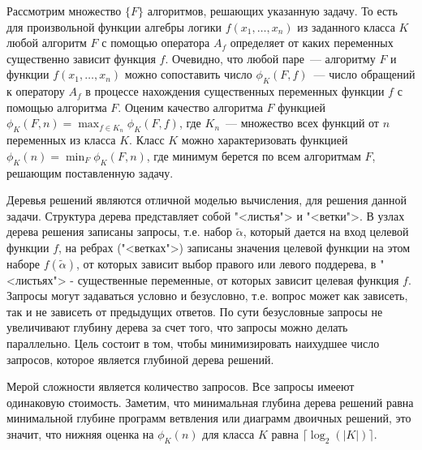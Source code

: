 \documentclass[oneside, final, 14pt]{extreport}
\begin{document}
	 Рассмотрим множество $\{F\}$ алгоритмов, решающих указанную задачу. То есть для произвольной функции алгебры логики $f(x_1, \ldots, x_n)$
	 из заданного класса $K$  любой алгоритм $F$ с помощью оператора $A_f$ определяет от каких переменных существенно зависит функция $f$.
	 Очевидно, что любой паре~--- алгоритму $F$ и функции $f(x_1, \ldots, x_n)$ можно сопоставить число $\phi_K(F,f)$~--- число обращений 
	 к оператору $A_f$ в процессе нахождения существенных переменных функции $f$ с помощью алгоритма $F$.  
	 Оценим качество алгоритма $F$ функцией $\phi_K(F,n) = \max_{f \in K_n}\phi_K(F, f)$, где $K_n$~--- множество всех функций от $n$ переменных из класса $K$.
	 Класс $K$ можно характеризовать функцией $\phi_K(n) = \min_F\phi_K(F, n)$, где минимум берется по всем алгоритмам $F$, решающим поставленную задачу.
	
	Деревья решений являются отличной  моделью вычисления, для решения данной задачи. Структура дерева представляет собой "<листья">
	и "<ветки">. В узлах дерева решения записаны запросы, т.е. набор $\tilde{\alpha}$, который дается на вход целевой функции $f$,
	на ребрах ("<ветках">) записаны значения целевой функции на этом наборе $f(\tilde{\alpha})$, от которых зависит выбор правого или левого
	поддерева, в "<листьях"> - существенные переменные, от которых зависит целевая функция $f$. Запросы могут задаваться условно и безусловно,
	т.е. вопрос может как зависеть, так и не зависеть  от предыдущих ответов. По сути безусловные запросы не увеличивают глубину дерева 
	за счет того, что запросы можно делать параллельно. Цель состоит в том, чтобы минимизировать наихудшее число запросов, которое
	является глубиной дерева решений.
	
	Мерой сложности является количество запросов. Все запросы имееют одинаковую стоимость. Заметим, что минимальная глубина дерева
	решений равна минимальной глубине программ ветвления или диаграмм двоичных решений\cite{wegener}, это значит, что нижняя оценка на
	$\phi_K(n)$ для класса $K$ равна $\lceil \log_2(|K|) \rceil$.
	
\end{document}
